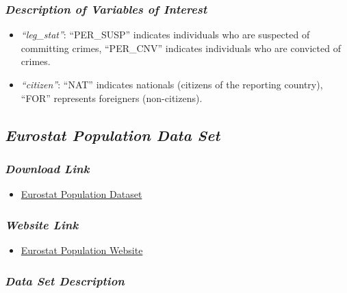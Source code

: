 \documentclass[
]{article}
\providecommand{\tightlist}{%
  \setlength{\itemsep}{0pt}\setlength{\parskip}{0pt}}\usepackage{longtable,booktabs,array}
\begin{document}
\subsubsection{\texorpdfstring{\emph{Description of Variables of
Interest}}{Description of Variables of Interest}}\label{description-of-variables-of-interest}

\begin{itemize}
\tightlist
\item
  \emph{``leg\_stat''}: ``PER\_SUSP'' indicates individuals who are
  suspected of committing crimes, ``PER\_CNV'' indicates individuals who
  are convicted of crimes.
\item
  \emph{``citizen''}: ``NAT'' indicates nationals (citizens of the
  reporting country), ``FOR'' represents foreigners (non-citizens).
\end{itemize}

\subsection{\texorpdfstring{\emph{Eurostat Population Data
Set}}{Eurostat Population Data Set}}\label{eurostat-population-data-set}

\subsubsection{\texorpdfstring{\emph{Download
Link}}{Download Link}}\label{download-link-1}

\begin{itemize}
\tightlist
\item
  \href{https://ec.europa.eu/eurostat/databrowser/view/migr_pop2ctz/default/table?lang=en&category=demo.demo_pop}{Eurostat
  Population Dataset}
\end{itemize}

\subsubsection{\texorpdfstring{\emph{Website
Link}}{Website Link}}\label{website-link-1}

\begin{itemize}
\tightlist
\item
  \href{https://ec.europa.eu/eurostat/api/dissemination/sdmx/2.1/data/migr_pop2ctz?format=TSV&compressed=true}{Eurostat
  Population Website}
\end{itemize}

\subsubsection{\texorpdfstring{\emph{Data Set
Description}}{Data Set Description}}\label{data-set-description-1}
\end{document}
